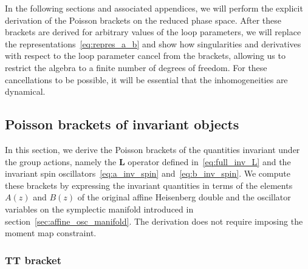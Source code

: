In the following sections and associated appendices, we will perform the explicit derivation of the Poisson brackets on the reduced phase space. After these brackets are derived for arbitrary values of the loop parameters, we will replace the representations~\eqref{eq:repres_a_b} and show how singularities and derivatives with respect to the loop parameter cancel from the brackets, allowing us to restrict the algebra to a finite number of degrees of freedom. For these cancellations to be possible, it will be essential that the inhomogeneities are dynamical.


\subsection{Poisson brackets of invariant objects}
\label{sec:Poisson_inv}

In this section, we derive the Poisson brackets of the quantities invariant under the group actions, namely the $\mathbf{L}$ operator defined in~\eqref{eq:full_inv_L} and the invariant spin oscillators~\eqref{eq:a_inv_spin} and~\eqref{eq:b_inv_spin}. We compute these brackets by expressing the invariant quantities in terms of the elements $A(z)$ and $B(z)$ of the original affine Heisenberg double and the oscillator variables on the symplectic manifold introduced in section~\ref{sec:affine_osc_manifold}. The derivation does not require imposing the moment map constraint.


\subsubsection{TT bracket}
\label{sec:variations_and_Green_elliptic}

